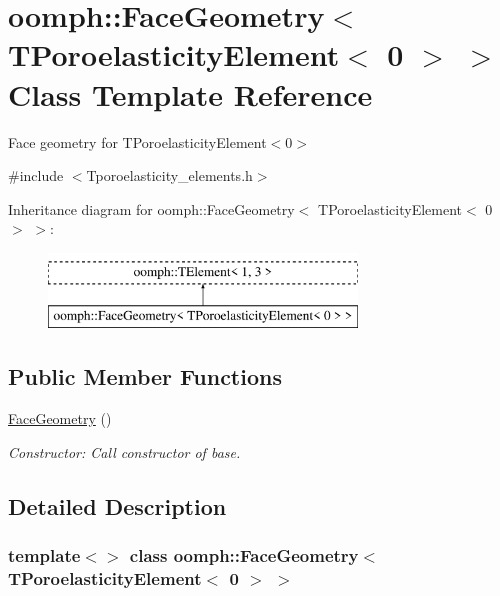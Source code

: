 \hypertarget{classoomph_1_1FaceGeometry_3_01TPoroelasticityElement_3_010_01_4_01_4}{}\section{oomph\+:\+:Face\+Geometry$<$ T\+Poroelasticity\+Element$<$ 0 $>$ $>$ Class Template Reference}
\label{classoomph_1_1FaceGeometry_3_01TPoroelasticityElement_3_010_01_4_01_4}


Face geometry for T\+Poroelasticity\+Element$<$0$>$  




{\ttfamily \#include $<$Tporoelasticity\+\_\+elements.\+h$>$}

Inheritance diagram for oomph\+:\+:Face\+Geometry$<$ T\+Poroelasticity\+Element$<$ 0 $>$ $>$\+:\begin{figure}[H]
\begin{center}
\leavevmode
\includegraphics[height=2.000000cm]{classoomph_1_1FaceGeometry_3_01TPoroelasticityElement_3_010_01_4_01_4}
\end{center}
\end{figure}
\subsection*{Public Member Functions}
\begin{DoxyCompactItemize}
\item 
\hyperlink{classoomph_1_1FaceGeometry_3_01TPoroelasticityElement_3_010_01_4_01_4_a3a2d7743dbb5afc9235b79e61d1011a7}{Face\+Geometry} ()
\begin{DoxyCompactList}\small\item\em Constructor\+: Call constructor of base. \end{DoxyCompactList}\end{DoxyCompactItemize}


\subsection{Detailed Description}
\subsubsection*{template$<$$>$\newline
class oomph\+::\+Face\+Geometry$<$ T\+Poroelasticity\+Element$<$ 0 $>$ $>$}

